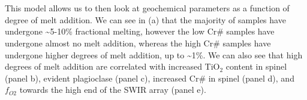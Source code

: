 \documentclass[11pt]{article}
\begin{document}
    \begin{center}
    \end{center}
    { \hspace*{\fill} \\}
    
    \begin{center}
    \end{center}
    { \hspace*{\fill} \\}
    
    This model allows us to then look at geochemical parameters as a
function of degree of melt addition. We can see in (a) that the majority
of samples have undergone \textasciitilde{}5-10\% fractional melting,
however the low Cr\# samples have undergone almost no melt addition,
whereas the high Cr\# samples have undergone higher degrees of melt
addition, up to \textasciitilde{}1\%. We can also see that high degrees
of melt addition are correlated with increased TiO\(_2\) content in
spinel (panel b), evident plagioclase (panel c), increased Cr\# in
spinel (panel d), and \(f_{O2}\) towards the high end of the SWIR array
(panel e).
\end{document}
